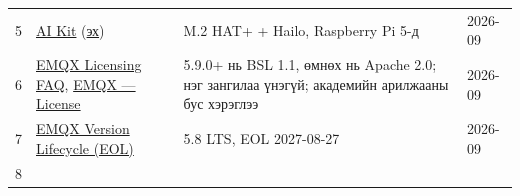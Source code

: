 \begin{longtable}[]{@{}llll@{}}
\begin{minipage}[t]{0.22\columnwidth}
5\strut
\end{minipage} & \begin{minipage}[t]{0.22\columnwidth}\raggedright
\href{https://www.raspberrypi.com/documentation/accessories/ai-kit.html}{AI Kit} (\href{https://github.com/raspberrypi/documentation/blob/develop/documentation/asciidoc/accessories/ai-kit/about.adoc}{эх})\strut
\end{minipage} & \begin{minipage}[t]{0.22\columnwidth}\raggedright
M.2 HAT+ + Hailo, Raspberry Pi 5-д\strut
\end{minipage} & \begin{minipage}[t]{0.22\columnwidth}\raggedright
2026-09\strut
\end{minipage}\tabularnewline
\begin{minipage}[t]{0.22\columnwidth}\raggedright
6\strut
\end{minipage} & \begin{minipage}[t]{0.22\columnwidth}\raggedright
\href{https://www.emqx.com/en/content/license-faq}{EMQX Licensing FAQ}, \href{https://docs.emqx.com/en/emqx/latest/deploy/license.html}{EMQX --- License}\strut
\end{minipage} & \begin{minipage}[t]{0.22\columnwidth}\raggedright
5.9.0+ нь BSL 1.1, өмнөх нь Apache 2.0; нэг зангилаа үнэгүй; академийн арилжааны бус хэрэглээ\strut
\end{minipage} & \begin{minipage}[t]{0.22\columnwidth}\raggedright
2026-09\strut
\end{minipage}\tabularnewline
\begin{minipage}[t]{0.22\columnwidth}\raggedright
7\strut
\end{minipage} & \begin{minipage}[t]{0.22\columnwidth}\raggedright
\href{https://docs.emqx.com/en/emqx/latest/changes/eol-ee.html}{EMQX Version Lifecycle (EOL)}\strut
\end{minipage} & \begin{minipage}[t]{0.22\columnwidth}\raggedright
5.8 LTS, EOL 2027-08-27\strut
\end{minipage} & \begin{minipage}[t]{0.22\columnwidth}\raggedright
2026-09\strut
\end{minipage}\tabularnewline
\begin{minipage}[t]{0.22\columnwidth}\raggedright
8\strut
\end{minipage} & \begin{minipage}[t]{0.22\columnwidth}\raggedright

\end{minipage}
\end{longtable}
